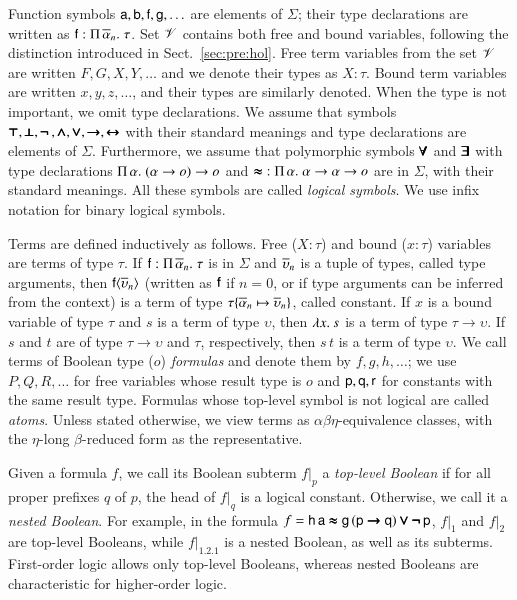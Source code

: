 Function symbols $\mathsf{a}, \mathsf{b}, \mathsf{f}, \mathsf{g}, \ldots$ are elements of
$\Sigma$; their type declarations are written as $\mathsf{f} :
\Pi\,\overline{\alpha}_{n}.\; \tau$. Set $\mathscr{V}$ contains both free and bound variables, following
the distinction introduced in Sect.~\ref{sec:pre:hol}. Free term variables from the set $\mathscr{V}$ are written
$F,G,X,Y, \ldots$ and we denote their types as $X : \tau$. Bound term variables are written $x,y,z,\ldots$,
and their types are similarly denoted. When the type is not
important, we omit type declarations. We assume that symbols $\pmb{\top},
\pmb{\bot},\pmb{\neg\,},\pmb{\land}, \pmb{\lor},\pmb{\rightarrow},\pmb{\leftrightarrow}$ with their standard meanings and type declarations are elements of
$\Sigma$. Furthermore, we assume that polymorphic symbols $\pmb{\forall}$ and $\pmb{\exists}$
with type declarations $\Pi\,\alpha.\; (\alpha \rightarrow o) \rightarrow o$
and $\pmb{\approx} \; : \Pi\,\alpha.\; {\alpha \rightarrow \alpha \rightarrow o}$ are
in $\Sigma$, with their standard meanings. All these symbols are called \emph{logical
symbols}. We use infix notation for binary logical symbols.

 Terms are defined inductively as follows. Free ($X : \tau$)  and bound ($x : \tau$) variables   are
terms of type $\tau$. If $\mathsf{f} : \Pi\,\overline{\alpha}_{n}.\; \tau$ is in
$\Sigma$ and $\overline{\upsilon}_{n}$ is a tuple of types, called type arguments, then
$\mathsf{f}{\langle\overline{\upsilon}_{n}\rangle}$ (written as $\mathsf{f}$ if $n=0$, or if type
arguments can be inferred from the context) is a term of type $\tau \{
\overline{\alpha}_{n} \mapsto \overline{\upsilon}_{n} \}$, called constant. If $x$ is a bound variable
of type $\tau$ and $s$ is a term of type $\upsilon$, then $\lambda x.\> s$ is a term of type
$\tau \rightarrow \upsilon$. If $s$ and $t$ are of type $\tau \rightarrow \upsilon$ and
$\tau$, respectively, then $s \, t$ is a term of type $\upsilon$. We call terms of
Boolean type ($o$) \emph{formulas} and denote them by $f,g,h, \ldots$; we use
$P,Q,R, \ldots$ for free variables whose result type is $o$ and
$\mathsf{p},\mathsf{q},\mathsf{r}$ for constants with the same result type.
%
Formulas whose top-level symbol is not logical are called \emph{atoms}.
Unless stated otherwise, we view terms as
$\alpha\beta\eta$-equivalence classes, with the $\eta$-long $\beta$-reduced form as
the representative.

Given a formula $f$, we call its Boolean subterm $f|_p$ a \emph{top-level
Boolean} if for all proper prefixes $q$ of $p$, the head of $f|_q$ is a logical
constant. Otherwise, we call it a \emph{nested Boolean}. For example, in the
formula $f = \mathsf{h} \, \mathsf{a} \pmb{\approx} \mathsf{g} \, (\mathsf{p} \pmb{\rightarrow} \mathsf{q}) \pmb{\lor}
\pmb{\neg\,}\mathsf{p}$, $f|_1$ and $f|_2$ are top-level Booleans, while $f|_{1.2.1}$ is a
nested Boolean, as well as its subterms. First-order logic allows only top-level
Booleans, whereas nested Booleans are characteristic for higher-order logic. 


